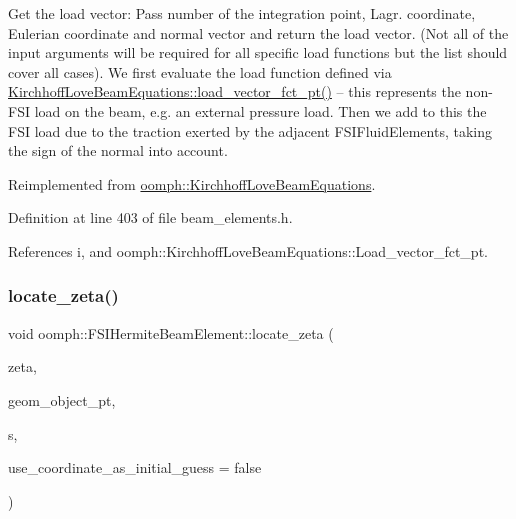 Get the load vector\+: Pass number of the integration point, Lagr. coordinate, Eulerian coordinate and normal vector and return the load vector. (Not all of the input arguments will be required for all specific load functions but the list should cover all cases). We first evaluate the load function defined via \hyperlink{classoomph_1_1KirchhoffLoveBeamEquations_a0710dd43c856aaa9c94d3112f8cba7ed}{Kirchhoff\+Love\+Beam\+Equations\+::load\+\_\+vector\+\_\+fct\+\_\+pt()} -- this represents the non-\/\+F\+SI load on the beam, e.\+g. an external pressure load. Then we add to this the F\+SI load due to the traction exerted by the adjacent F\+S\+I\+Fluid\+Elements, taking the sign of the normal into account. 



Reimplemented from \hyperlink{classoomph_1_1KirchhoffLoveBeamEquations_aef8e5b3abb7669c7292103d7061f10c6}{oomph\+::\+Kirchhoff\+Love\+Beam\+Equations}.



Definition at line 403 of file beam\+\_\+elements.\+h.



References i, and oomph\+::\+Kirchhoff\+Love\+Beam\+Equations\+::\+Load\+\_\+vector\+\_\+fct\+\_\+pt.

\mbox{\label{classoomph_1_1FSIHermiteBeamElement_ae56f8245dbbb641c98d326780ff9400d}} 
\subsubsection{\texorpdfstring{locate\+\_\+zeta()}{locate\_zeta()}}
{\footnotesize\ttfamily void oomph\+::\+F\+S\+I\+Hermite\+Beam\+Element\+::locate\+\_\+zeta (\begin{DoxyParamCaption}\item[{const \hyperlink{classoomph_1_1Vector}{Vector}$<$ double $>$ \&}]{zeta,  }\item[{\hyperlink{classoomph_1_1GeomObject}{Geom\+Object} $\ast$\&}]{geom\+\_\+object\+\_\+pt,  }\item[{\hyperlink{classoomph_1_1Vector}{Vector}$<$ double $>$ \&}]{s,  }\item[{const bool \&}]{use\+\_\+coordinate\+\_\+as\+\_\+initial\+\_\+guess = {\ttfamily false} }\end{DoxyParamCaption})\hspace{0.3cm}{\ttfamily [virtual]}}



